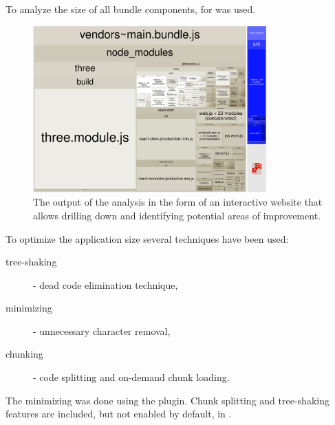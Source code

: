 \medskip
To analyze the size of all bundle components,  for  was used. 

\medskip

\begin{figure}[H]
	\caption{The output of the analysis in the form of an interactive website that allows drilling down and identifying potential areas of improvement.}
  \centering
    \includegraphics[width=0.8\textwidth]{assets/3-bundle.png}
\end{figure}

To optimize the application size several techniques have been used:

\begin{description}
	\item[tree-shaking] - dead code elimination technique,
	\item[minimizing] - unnecessary character removal,
	\item[chunking] - code splitting and on-demand chunk loading.
\end{description}

The minimizing was done using the  plugin. Chunk splitting and tree-shaking features are included, but not enabled by default, in .

